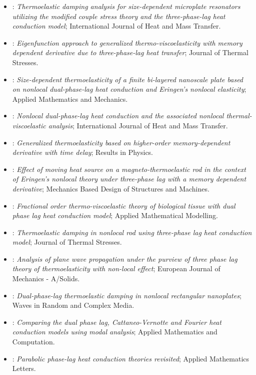 \begin{itemize}
\item \citet{Kumar2020}: \emph{Thermoelastic damping analysis for size-dependent microplate resonators utilizing the modified couple stress theory and the three-phase-lag heat conduction model}; International Journal of Heat and Mass Transfer.
\item \citet{Singh2020a}: \emph{Eigenfunction approach to generalized thermo-viscoelasticity with memory dependent derivative due to three-phase-lag heat transfer}; Journal of Thermal Stresses.
\item \citet{Xue2020}: \emph{Size-dependent thermoelasticity of a finite bi-layered nanoscale plate based on nonlocal dual-phase-lag heat conduction and Eringen's nonlocal elasticity}; Applied Mathematics and Mechanics.
\item \citet{Yang2020}: \emph{Nonlocal dual-phase-lag heat conduction and the associated nonlocal thermal-viscoelastic analysis}; International Journal of Heat and Mass Transfer.
\item \citet{Abouelregal2021}: \emph{Generalized thermoelasticity based on higher-order memory-dependent derivative with time delay}; Results in Physics.
\item \citet{Bayones2021}: \emph{Effect of moving heat source on a magneto-thermoelastic rod in the context of Eringen’s nonlocal theory under three-phase lag with a memory dependent derivative}; Mechanics Based Design of Structures and Machines.
\item \citet{Li2021}: \emph{Fractional order thermo-viscoelastic theory of biological tissue with dual phase lag heat conduction model}; Applied Mathematical Modelling.
\item \citet{Satish2021}: \emph{Thermoelastic damping in nonlocal rod using three-phase lag heat conduction model}; Journal of Thermal Stresses.
\item \citet{Tiwari2021}: \emph{Analysis of plane wave propagation under the purview of three phase lag theory of thermoelasticity with non-local effect}; European Journal of Mechanics - A/Solids.
\item \citet{Yang2021}: \emph{Dual-phase-lag thermoelastic damping in nonlocal rectangular nanoplates}; Waves in Random and Complex Media.
\item \citet{vanDerMerwe2021}: \emph{Comparing the dual phase lag, Cattaneo-Vernotte and Fourier heat conduction models using modal analysis}; Applied Mathematics and Computation.
\item \citet{Miranville2022}: \emph{Parabolic phase-lag heat conduction theories revisited}; Applied Mathematics Letters.

\end{itemize}
